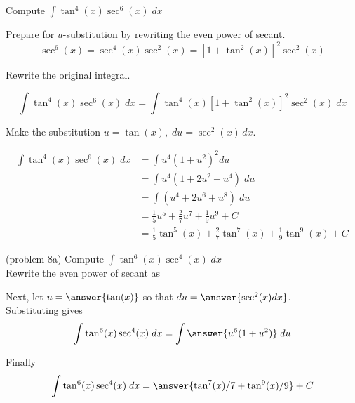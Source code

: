 \documentclass{ximera}
\begin{document}
\begin{example}[example 8]
Compute $\displaystyle{\int \tan^4(x) \sec^6(x)\;dx}$

Prepare for $u$-substitution by rewriting the even power of secant.
\[
\sec^6(x) = \sec^4(x) \sec^2(x) = \left[1+\tan^2(x)\right]^2 \sec^2(x)
\]

Rewrite the original integral.

\[
\int \tan^4(x) \sec^6(x)\;dx = \int \tan^4(x) \left[1+\tan^2(x)\right]^2 \sec^2(x) \; dx
\]

Make the substitution $u = \tan(x), \; du = \sec^2(x) \, dx$.


\begin{align*}
\int \tan^4(x) \sec^6(x)\;dx &= \int u^4 (1+u^2)^2 du\\
&= \int u^4(1+2u^2 + u^4) \; du \\
&= \int (u^4 + 2u^6 + u^8) \; du \\
&=  \tfrac15 u^5 + \tfrac27 u^7 + \tfrac19 u^9 + C  \\
&= \tfrac15\tan^5(x)  + \tfrac27 \tan^7(x) + \tfrac19 \tan^9(x) + C
\end{align*}
\end{example} 



\begin{problem}(problem 8a)
Compute $\displaystyle{\int \tan^6(x)\sec^4(x) \; dx}$\\

Rewrite the even power of secant as

\begin{multipleChoice}
\end{multipleChoice}

Next, let $u = \answer{\tan(x)}$ so that $du = \answer{\sec^2(x) dx}$.\\

Substituting gives 
\[
\int \tan^6(x)\sec^4(x) \; dx= \int \answer{u^6(1+u^2)} \; du
\]

Finally 
\[
\int \tan^6(x)\sec^4(x) \; dx= \answer{\tan^7(x)/7 +  \tan^9(x)/9} + C
\]

\end{problem}
\end{document}
